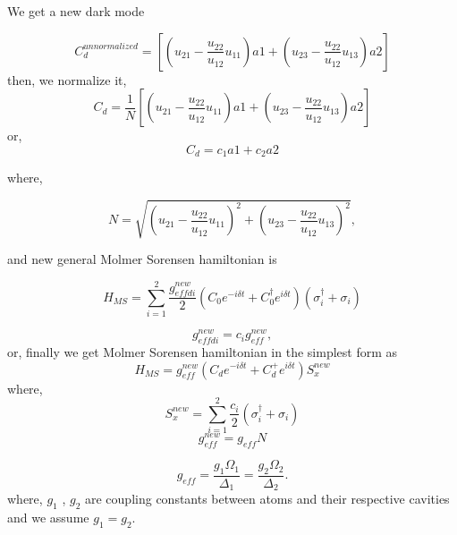 \documentclass{article}
\begin{document}
We get a new dark mode 

\begin{equation}
 C_{d}^{unnormalized} = \left[\left( u_{21} - \frac{u_{22}}{u_{12}}u_{11}\right) a1 + \left( u_{23} - \frac{u_{22}}{u_{12}} u_{13}\right) a2\right]   
\end{equation}
then, we normalize it, 
\begin{equation}
 C_{d} = \frac{1}{N}\left[\left( u_{21} - \frac{u_{22}}{u_{12}}u_{11}\right) a1 + \left( u_{23} - \frac{u_{22}}{u_{12}} u_{13}\right) a2\right]   
\end{equation}
or,
\begin{equation}
 C_{d} = c_1a1 + c_2a2   
\end{equation}

where, 

\begin{equation}
    N = \sqrt{\left( u_{21} - \frac{u_{22}}{u_{12}}u_{11}\right)^2 + \left( u_{23} - \frac{u_{22}}{u_{12}} u_{13}\right)^2},
\end{equation}


and new general Molmer Sorensen hamiltonian is 

\begin{equation}
    H_{MS} = \sum_{i=1}^{2} \frac{g_{effdi}^{new}}{2} (C_0 e^{-i \delta t} + C_0^{\dagger} e^{i \delta t}) (\sigma^{\dagger}_i+\sigma_i) 
\end{equation}

\begin{equation}
    g_{effdi}^{new} = c_{i} g_{eff}^{new},
\end{equation}
or, finally we get Molmer Sorensen hamiltonian in the simplest form as
\begin{equation}
      H_{MS} = g_{eff}^{new} (C_{d} e^{-i \delta t} + C_{d}^{+} e^{i \delta t}) S_x^{new} 
\end{equation}
 where,
 \begin{equation}
    S_x^{new} = \sum_{i=1}^{2} \frac{c_i}{2} (\sigma^{\dagger}_i+\sigma_i)  
\end{equation}
\begin{equation}
    g_{eff}^{new} = g_{eff}N
\end{equation} 

\begin{equation}
    g_{eff} = \frac{g_1\Omega_1}{\Delta_1} = \frac{g_2\Omega_2}{\Delta_2}.
\end{equation}
where, $g_1$ , $g_2$ are coupling constants between atoms and their respective cavities and we assume $g_1=g_2$. 

\end{document}
